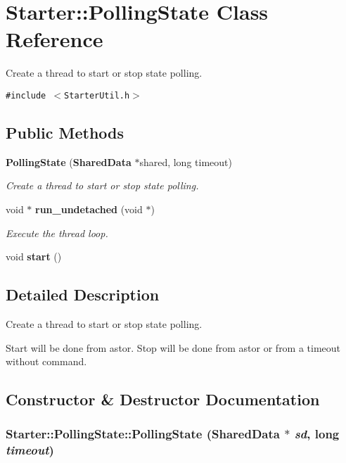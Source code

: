 \section{Starter::Polling\-State  Class Reference}
\label{classStarter_1_1PollingState}
Create a thread to start or stop state polling. 


{\tt \#include $<$Starter\-Util.h$>$}

\subsection*{Public Methods}
\begin{CompactItemize}
\item 
{\bf Polling\-State} ({\bf Shared\-Data} $\ast$shared, long timeout)
\begin{CompactList}\small\item\em Create a thread to start or stop state polling.\item\end{CompactList}\item 
void $\ast$ {\bf run\_\-undetached} (void $\ast$)
\begin{CompactList}\small\item\em Execute the thread loop.\item\end{CompactList}\item 
void {\bf start} ()
\end{CompactItemize}


\subsection{Detailed Description}
Create a thread to start or stop state polling.

Start will be done from astor. Stop will be done from astor or from a timeout without command. 



\subsection{Constructor \& Destructor Documentation}
\subsubsection{\setlength{\rightskip}{0pt plus 5cm}Starter::Polling\-State::Polling\-State ({\bf Shared\-Data} $\ast$ {\em sd}, long {\em timeout})}\label{classStarter_1_1PollingState_a0}


